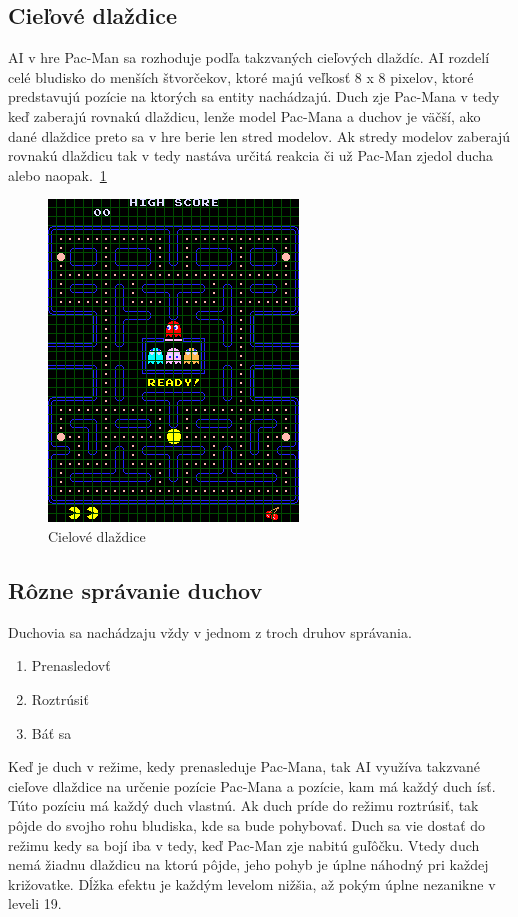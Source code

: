 \documentclass[10pt,oneside,slovak,a4paper]{article}
\begin{document}
\subsection{Cieľové dlaždice}
AI v hre Pac-Man sa rozhoduje podľa takzvaných cieľových dlaždíc. AI rozdelí celé bludisko do menších štvorčekov, ktoré majú veľkosť 8 x 8 pixelov, ktoré predstavujú pozície na ktorých sa entity nachádzajú. Duch zje Pac-Mana v tedy keď zaberajú rovnakú dlaždicu, lenže model Pac-Mana a duchov je väčší, ako dané dlaždice preto sa v hre berie len stred modelov. Ak stredy modelov zaberajú rovnakú dlaždicu tak v tedy nastáva určitá reakcia či už Pac-Man zjedol ducha alebo naopak.~\ref{fig:cd}\cite{2.zdroj}
\begin{figure} [h!]
  \includegraphics[scale=0.36]{cielove dlazdice.png}
  \caption{Cielové dlaždice}
  \label{fig:cd}
\end{figure}

\subsection{Rôzne správanie duchov}
Duchovia sa nachádzaju vždy v jednom z troch druhov správania.
\begin{enumerate}
    \item Prenasledovť
    \item Roztrúsiť
    \item Báť sa
\end{enumerate}
Keď je duch v režime, kedy prenasleduje Pac-Mana, tak AI využíva takzvané cieľove dlaždice na určenie pozície Pac-Mana a pozície, kam má každý duch ísť. Túto pozíciu má každý duch vlastnú.
Ak duch príde do režimu roztrúsiť, tak pôjde do svojho rohu bludiska, kde sa bude pohybovať.
Duch sa vie dostať do režimu kedy sa bojí iba v tedy, keď Pac-Man zje nabitú guľôčku. Vtedy duch nemá žiadnu dlaždicu na ktorú pôjde, jeho pohyb je úplne náhodný pri každej križovatke. Dĺžka efektu je každým levelom nižšia, až pokým úplne nezanikne v leveli 19.
\end{document}

